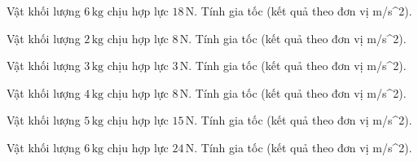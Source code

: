\begin{ex}
Vật khối lượng $6\,\text{kg}$ chịu hợp lực $18\,\text{N}$. Tính gia tốc (kết quả theo đơn vị m/s^2).
\end{ex}

\begin{ex}
Vật khối lượng $2\,\text{kg}$ chịu hợp lực $8\,\text{N}$. Tính gia tốc (kết quả theo đơn vị m/s^2).
\end{ex}

\begin{bt}
Vật khối lượng $3\,\text{kg}$ chịu hợp lực $3\,\text{N}$. Tính gia tốc (kết quả theo đơn vị m/s^2).
\end{bt}

\begin{bt}
Vật khối lượng $4\,\text{kg}$ chịu hợp lực $8\,\text{N}$. Tính gia tốc (kết quả theo đơn vị m/s^2).
\end{bt}

\begin{bt}
Vật khối lượng $5\,\text{kg}$ chịu hợp lực $15\,\text{N}$. Tính gia tốc (kết quả theo đơn vị m/s^2).
\end{bt}

\begin{bt}
Vật khối lượng $6\,\text{kg}$ chịu hợp lực $24\,\text{N}$. Tính gia tốc (kết quả theo đơn vị m/s^2).
\end{bt}

